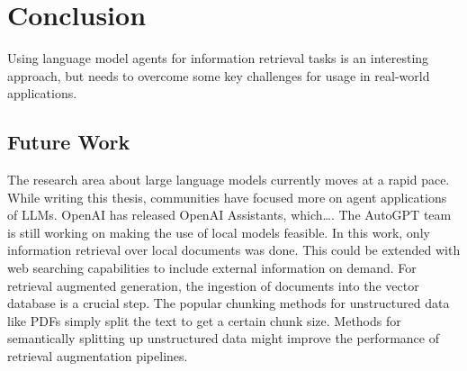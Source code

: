 \documentclass[../main.tex]{subfiles}
\begin{document}
\chapter{Conclusion}
\label{ch:conclusion}

Using language model agents for information retrieval tasks is an interesting approach,
but needs to overcome some key challenges for usage in real-world applications.

\section{Future Work}

The research area about large language models currently moves at a rapid pace.
While writing this thesis, communities have focused more on agent applications of LLMs.
OpenAI has released OpenAI Assistants, which\dots.
The AutoGPT team is still working on making the use of local models feasible.
In this work, only information retrieval over local documents was done.
This could be extended with web searching capabilities to include external information on demand.
For retrieval augmented generation, the ingestion of documents into the vector database is a crucial step.
The popular chunking methods for unstructured data like PDFs simply split the text to get a certain chunk size.
Methods for semantically splitting up unstructured data might improve the performance of retrieval augmentation pipelines.
\end{document}
